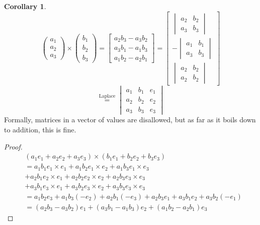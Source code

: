 \documentclass[a4paper,landscape,twocolumn]{article}
\theoremstyle{definition}
\newtheorem{cor}{Corollary}
\begin{document}
\begin{cor}
  \label{cor-8.10}
  \[
    \begin{pmatrix}
      a_1 \\ a_2 \\ a_3
    \end{pmatrix} \times
    \begin{pmatrix}
      b_1 \\ b_2 \\ b_3
    \end{pmatrix}
    = \begin{bmatrix}
      a_2 b_3 - a_3 b_2 \\
      a_3 b_1 - a_1 b_3 \\
      a_1 b_2 - a_2 b_1
    \end{bmatrix}
    = \begin{bmatrix}
      \begin{vmatrix}
        a_2 & b_2 \\
        a_3 & b_3
      \end{vmatrix} \\
      -
      \begin{vmatrix}
        a_1 & b_1 \\
        a_3 & b_3
      \end{vmatrix} \\
      \begin{vmatrix}
        a_2 & b_2 \\
        a_2 & b_2
      \end{vmatrix}
    \end{bmatrix}
  \] \[
    \overset{\text{Laplace}}{=}
    \begin{vmatrix}
      a_1 & b_1 & e_1 \\
      a_2 & b_2 & e_2 \\
      a_3 & b_3 & e_3
    \end{vmatrix}
  \]
  Formally, matrices in a vector of values are disallowed,
  but as far as it boils down to addition, this is fine.
\end{cor}

\begin{proof}
  \begin{align*}
    & (a_1 e_1 + a_2 e_2 + a_3 e_3) \times (b_1 e_1 + b_2 e_2 + b_3 e_3) \\
    &= a_1 b_1 e_1 \times e_1 + a_1 b_2 e_1 \times e_2 + a_1 b_3 e_1 \times e_3 \\
    &+ a_2 b_1 e_2 \times e_1 + a_2 b_2 e_2 \times e_2 + a_2 b_3 e_3 \times e_3 \\
    &+ a_3 b_1 e_3 \times e_1 + a_3 b_2 e_3 \times e_2 + a_3 b_3 e_3 \times e_3 \\
    &= a_1 b_2 e_3 + a_1 b_3 (-e_2)
    + a_2 b_1 (-e_3) + a_2 b_3 e_1 +
    a_3 b_1 e_2 + a_3 b_2 (-e_1) \\
    &= (a_2 b_3 - a_3 b_2) e_1 + (a_3 b_1 - a_1 b_3) e_2 + (a_1 b_2 - a_2 b_1) e_3
  \end{align*}
\end{proof}
\end{document}
